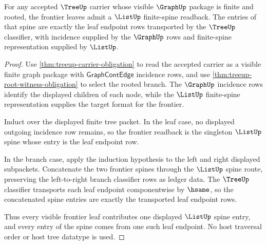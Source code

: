\begin{theorem}
\label{thm:tree-list-frontier-readback}
For any accepted $\TreeUp$ carrier whose visible $\GraphUp$ package is finite and rooted, the frontier leaves admit a $\ListUp$ finite-spine readback. The entries of that spine are exactly the leaf endpoint rows transported by the $\TreeUp$ classifier, with incidence supplied by the $\GraphUp$ rows and finite-spine representation supplied by $\ListUp$.
\end{theorem}
\begin{proof}
Use \autoref{thm:treeup-carrier-obligation} to read the accepted carrier as a visible finite graph package with $\mathsf{GraphContEdge}$ incidence rows, and use \autoref{thm:treeup-root-witness-obligation} to select the rooted branch. The $\GraphUp$ incidence rows identify the displayed children of each node, while the $\ListUp$ finite-spine representation supplies the target format for the frontier.

Induct over the displayed finite tree packet. In the leaf case, no displayed outgoing incidence row remains, so the frontier readback is the singleton $\ListUp$ spine whose entry is the leaf endpoint row.

In the branch case, apply the induction hypothesis to the left and right displayed subpackets. Concatenate the two frontier spines through the $\ListUp$ spine route, preserving the left-to-right branch classifier rows as ledger data. The $\TreeUp$ classifier transports each leaf endpoint componentwise by $\hsame$, so the concatenated spine entries are exactly the transported leaf endpoint rows.

Thus every visible frontier leaf contributes one displayed $\ListUp$ spine entry, and every entry of the spine comes from one such leaf endpoint. No host traversal order or host tree datatype is used.
\end{proof}

